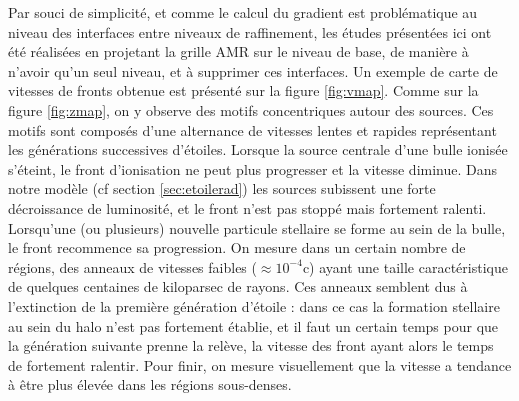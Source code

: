 Par souci de simplicité, et comme le calcul du gradient est problématique au niveau des interfaces entre niveaux de raffinement, les études présentées ici ont été réalisées en projetant la grille \ac{AMR} sur le niveau de base, de manière à n'avoir qu'un seul niveau, et à supprimer ces interfaces.
Un exemple de carte de vitesses de fronts obtenue est présenté sur la figure \ref{fig:vmap}.
Comme sur la figure \ref{fig:zmap}, on y observe des motifs concentriques autour des sources.
Ces motifs sont composés d'une alternance de vitesses lentes et rapides représentant les générations successives d'étoiles.
Lorsque la source centrale d'une bulle ionisée s’éteint, le front d'ionisation ne peut plus progresser et la vitesse diminue.
Dans notre modèle (cf section \ref{sec:etoilerad}) les sources subissent une forte décroissance de luminosité, et le front n'est pas stoppé mais fortement ralenti.
Lorsqu'une (ou plusieurs) nouvelle particule stellaire se forme au sein de la bulle, le front recommence sa progression.
On mesure dans un certain nombre de régions, des anneaux de vitesses faibles ($\approx 10^{-4}$c) ayant une taille caractéristique de quelques centaines de kiloparsec de rayons.
Ces anneaux semblent dus à l'extinction de la première génération d'étoile : dans ce cas la formation stellaire au sein du halo n'est pas fortement établie, et il faut un certain temps pour que la génération suivante prenne la relève, la vitesse des front ayant alors le temps de fortement ralentir.
Pour finir, on mesure visuellement que la vitesse a tendance à être plus élevée dans les régions sous-denses.

